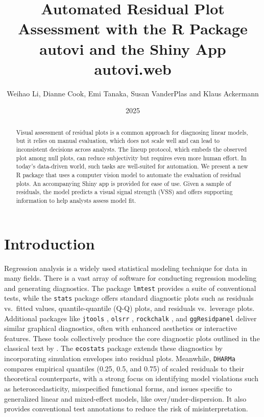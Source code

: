 \documentclass[
doublespace,
  times]{anzsauth}
\title{Automated Residual Plot Assessment with the R Package autovi and
the Shiny App autovi.web}
\author{
Weihao Li\addressnum{1},
Dianne Cook\addressnum{1},
Emi Tanaka\addressnum{2},
Susan VanderPlas\addressnum{3} and
Klaus Ackermann\addressnum{1}
}
\affiliation{
Monash University,
The Australian National University and
University of Nebraska
}
\date{2025}
\begin{document}
\begin{abstract}
Visual assessment of residual plots is a common approach for diagnosing
linear models, but it relies on manual evaluation, which does not scale
well and can lead to inconsistent decisions across analysts. The lineup
protocol, which embeds the observed plot among null plots, can reduce
subjectivity but requires even more human effort. In today's data-driven
world, such tasks are well-suited for automation. We present a new R
package that uses a computer vision model to automate the evaluation of
residual plots. An accompanying Shiny app is provided for ease of use.
Given a sample of residuals, the model predicts a visual signal strength
(VSS) and offers supporting information to help analysts assess model
fit.
\end{abstract}

          

\maketitle


\section{Introduction}\label{sec-autovi-introduction}

Regression analysis is a widely used statistical modeling technique for
data in many fields. There is a vast array of software for conducting
regression modeling and generating diagnostics. The package
\texttt{lmtest} \citep{lmtest} provides a suite of conventional tests,
while the \texttt{stats} package \citep{stats} offers standard
diagnostic plots such as residuals vs.~fitted values, quantile-quantile
(Q-Q) plots, and residuals vs.~leverage plots. Additional packages like
\texttt{jtools} \citep{jtools}, \texttt{olsrr} \citep{olsrr},
\texttt{rockchalk} \citep{rockchalk}, and \texttt{ggResidpanel}
\citep{ggresidpanel} deliver similar graphical diagnostics, often with
enhanced aesthetics or interactive features. These tools collectively
produce the core diagnostic plots outlined in the classical text by
\citet{cook1982residuals}. The \texttt{ecostats} package
\citep{warton_global_2023} extends these diagnostics by incorporating
simulation envelopes into residual plots. Meanwhile, \texttt{DHARMa}
\citep{dharma} compares empirical quantiles (0.25, 0.5, and 0.75) of
scaled residuals to their theoretical counterparts, with a strong focus
on identifying model violations such as heteroscedasticity, misspecified
functional forms, and issues specific to generalized linear and
mixed-effect models, like over/under-dispersion. It also provides
conventional test annotations to reduce the risk of misinterpretation.
\end{document}
